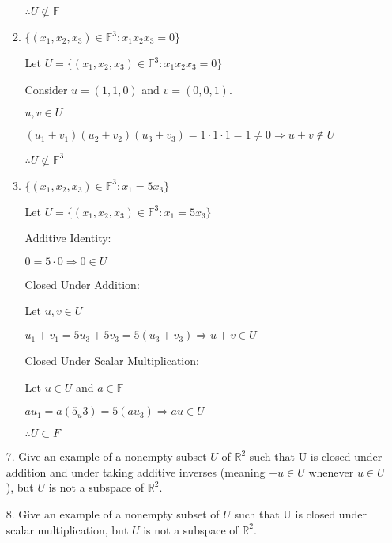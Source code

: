 \documentclass{article}
\begin{document}
\begin{enumerate}[nolistsep]
\begin{enumerate}[nolistsep]
			$\therefore U \not\subset \mathbb{F}$
			
			
			\item ${\{(x_1, x_2, x_3) \in \mathbb{F}^3 : x_1x_2x_3 = 0 \}}$
			
			Let $U = {\{(x_1, x_2, x_3) \in \mathbb{F}^3 : x_1x_2x_3 = 0 \}}$
			
			Consider $u = (1, 1, 0)$ and $v = (0, 0, 1)$.
			
			$u, v \in U$
			
			$(u_1 + v_1)(u_2 + v_2)(u_3 + v_3) = 1 \cdot 1 \cdot 1 = 1 \neq 0 \Rightarrow u + v \notin U$
			
			$\therefore U \not\subset \mathbb{F}^3$
			
			
			\item ${\{(x_1, x_2, x_3) \in \mathbb{F}^3 : x_1 = 5x_3 \}}$
			
			Let $U = \{(x_1, x_2, x_3) \in \mathbb{F}^3 : x_1 = 5x_3 \}$
			
			Additive Identity:
			
			$0 = 5 \cdot 0 \Rightarrow 0 \in U$
			
			Closed Under Addition:
			
			Let $u, v \in U$
			
			$u_1 + v_1 = 5u_3 + 5v_3 = 5(u_3 + v_3) \Rightarrow u + v \in U$
			
			Closed Under Scalar Multiplication:
			
			Let $u \in U$ and $a \in \mathbb{F}$
			
			$au_1 = a(5_u3) = 5(au_3) \Rightarrow au \in U$
			
			$\therefore U \subset F$
			
		\end{enumerate}
		\item[7.] Give an example of a nonempty subset $U$ of $\mathbb{R}^2$ such that U is closed under addition and under taking additive inverses (meaning $-u \in U$ whenever $u \in U$), but $U$ is not a subspace of $\mathbb{R}^2$.
		
		\item[8.] Give an example of a nonempty subset of $U$ such that U is closed under scalar multiplication, but $U$ is not a subspace of $\mathbb{R}^2$.
	\end{enumerate}
\end{document}
